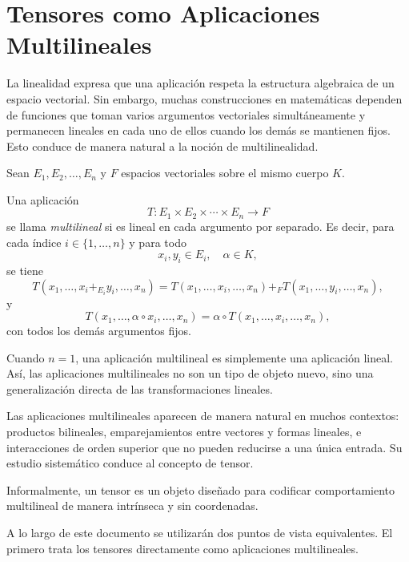 \chapter{Tensores como Aplicaciones Multilineales}

La linealidad expresa que una aplicación respeta la estructura algebraica de
un espacio vectorial.
Sin embargo, muchas construcciones en matemáticas dependen de funciones que
toman varios argumentos vectoriales simultáneamente y permanecen lineales en
cada uno de ellos cuando los demás se mantienen fijos. Esto conduce de manera
natural a la noción de multilinealidad.

\medskip

Sean \(E_1, E_2, \dots, E_n\) y \(F\) espacios vectoriales sobre el mismo
cuerpo \(K\).

\begin{definition}
Una aplicación
\[
T : E_1 \times E_2 \times \cdots \times E_n \to F
\]
se llama \emph{multilineal} si es lineal en cada argumento por separado.
Es decir, para cada índice \(i \in \{1,\dots,n\}\) y para todo
\[
x_i, y_i \in E_i, \quad \alpha \in K,
\]
se tiene
\[
T(x_1,\dots,x_i +_{E_i} y_i,\dots,x_n)
=
T(x_1,\dots,x_i,\dots,x_n)
+_F
T(x_1,\dots,y_i,\dots,x_n),
\]
y
\[
T(x_1,\dots,\alpha \circ x_i,\dots,x_n)
=
\alpha \circ T(x_1,\dots,x_i,\dots,x_n),
\]
con todos los demás argumentos fijos.
\end{definition}

Cuando \(n=1\), una aplicación multilineal es simplemente una aplicación lineal.
Así, las aplicaciones multilineales no son un tipo de objeto nuevo, sino una
generalización directa de las transformaciones lineales.

\medskip

Las aplicaciones multilineales aparecen de manera natural en muchos contextos:
productos bilineales, emparejamientos entre vectores y formas lineales,
e interacciones de orden superior que no pueden reducirse a una única entrada.
Su estudio sistemático conduce al concepto de tensor.

\medskip

Informalmente, un tensor es un objeto diseñado para codificar comportamiento
multilineal de manera intrínseca y sin coordenadas.

\medskip

A lo largo de este documento se utilizarán dos puntos de vista equivalentes.
El primero trata los tensores directamente como aplicaciones multilineales.

